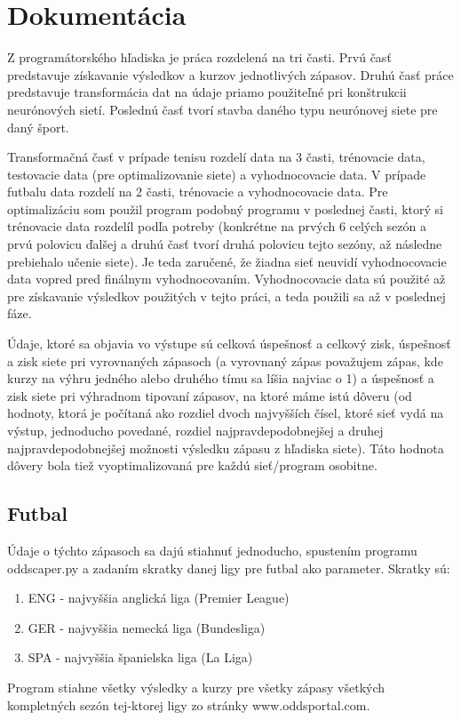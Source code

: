 

\chapter{Dokumentácia} \label{docu}

Z programátorského hľadiska je práca rozdelená na tri časti. 
Prvú časť predstavuje získavanie výsledkov a kurzov jednotlivých zápasov. 
Druhú časť práce predstavuje transformácia dat na údaje priamo použiteľné pri konštrukcii neurónových sietí.
Poslednú časť tvorí stavba daného typu neurónovej siete pre daný šport.

Transformačná časť v prípade tenisu rozdelí data na 3 časti, trénovacie data, testovacie data (pre optimalizovanie siete) a vyhodnocovacie data.
V prípade futbalu data rozdelí na 2 časti, trénovacie a vyhodnocovacie data.
Pre optimalizáciu som použil program podobný programu v poslednej časti, ktorý si trénovacie data rozdelíl podľa potreby (konkrétne na prvých 6 celých sezón a prvú polovicu ďalšej a druhú časť tvorí druhá polovicu tejto sezóny, až následne prebiehalo učenie siete).
Je teda zaručené, že žiadna sieť neuvidí vyhodnocovacie data vopred pred finálnym vyhodnocovaním.
Vyhodnocovacie data sú použité až pre získavanie výsledkov použitých v tejto práci, a teda použili sa až v poslednej fáze.


Údaje, ktoré sa objavia vo výstupe sú celková úspešnosť a celkový zisk, úspešnosť a zisk siete pri vyrovnaných zápasoch (a vyrovnaný zápas považujem zápas, kde kurzy na výhru jedného alebo druhého tímu sa líšia najviac o 1) a úspešnosť a zisk siete pri výhradnom tipovaní zápasov, na ktoré máme istú dôveru (od hodnoty, ktorá je počítaná ako rozdiel dvoch najvyšších čísel, ktoré sieť vydá na výstup, jednoducho povedané, rozdiel najpravdepodobnejšej a druhej najpravdepodobnejšej možnosti výsledku zápasu z hľadiska siete).
Táto hodnota dôvery bola tiež vyoptimalizovaná pre každú sieť/program osobitne.


\section{Futbal}

Údaje o týchto zápasoch sa dajú stiahnuť jednoducho, spustením programu oddscaper.py a zadaním skratky danej ligy pre futbal ako parameter.
Skratky sú:
\begin{enumerate}
\item ENG - najvyššia anglická liga (Premier League)
\item GER - najvyššia nemecká liga (Bundesliga)
\item SPA - najvyššia španielska liga (La Liga)
\end{enumerate}
Program stiahne všetky výsledky a kurzy pre všetky zápasy všetkých kompletných sezón tej-ktorej ligy zo stránky www.oddsportal.com.

